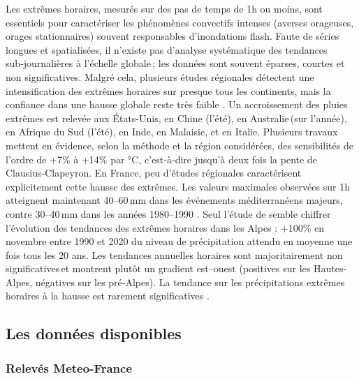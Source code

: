 \documentclass[
  article,
  nofooter,
  noheadings]{jss}
\begin{document}
Les extrêmes horaires, mesurés sur des pas de temps de 1h ou moins, sont
essentiels pour caractériser les phénomènes convectifs intenses (averses
orageuses, orages stationnaires) souvent responsables d'inondations
flash. Faute de séries longues et spatialisées, il n'existe pas
d'analyse systématique des tendances sub‑journalières à l'échelle
globale\,; les données sont souvent éparses, courtes et non
significatives. Malgré cela, plusieurs études régionales détectent une
intensification des extrêmes horaires sur presque tous les continents,
mais la confiance dans une hausse globale reste très faible
\citep{IPCC2021}. Un accroissement des pluies extrêmes est relevée aux
États-Unis, en Chine (l'été), en Australie\,(sur l'année), en Afrique du
Sud (l'été), en Inde, en Malaisie, et en Italie. Plusieurs travaux
mettent en évidence, selon la méthode et la région considérées, des
sensibilités de l'ordre de +7\% à +14\% par °C, c'est‑à‑dire jusqu'à
deux fois la pente de Clausius‑Clapeyron. En France, peu d'études
régionales caractérisent explicitement cette hausse des extrêmes. Les
valeurs maximales observées sur 1h atteignent maintenant 40--60\,mm dans
les événements méditerranéens majeurs, contre 30--40\,mm dans les années
1980--1990 \citep{meteofrance2024_episodesMediterraneens}. Seul l'étude
de \citet{Berghald2025} semble chiffrer l'évolution des tendances des
extrêmes horaires dans les Alpes : +100\% en novembre entre 1990 et 2020
du niveau de précipitation attendu en moyenne une fois tous les 20 ans.
Les tendances annuelles horaires sont majoritairement non
significatives\,et montrent plutôt un gradient est--ouest (positives sur
les Hautes-Alpes, négatives sur les pré‑Alpes). La tendance sur les
précipitations extrêmes horaires à la hausse est rarement significatives
\citep{Soubeyroux01022015}.

\subsection{Les données disponibles}\label{les-donnuxe9es-disponibles}

\subsubsection{Relevés Meteo-France}\label{relevuxe9s-meteo-france}
\end{document}
